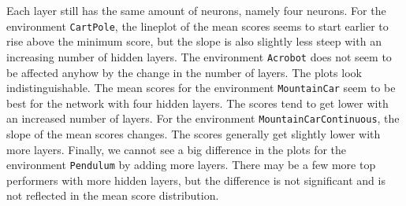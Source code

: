 Each layer still has the same amount of neurons, namely four neurons. For the environment \verb|CartPole|, the lineplot of the mean scores seems to start earlier to rise above the minimum score, but the slope is also slightly less steep with an increasing number of hidden layers. The environment \verb|Acrobot| does not seem to be affected anyhow by the change in the number of layers. The plots look indistinguishable. The mean scores for the environment \verb|MountainCar| seem to be best for the network with four hidden layers. The scores tend to get lower with an increased number of layers. For the environment \verb|MountainCarContinuous|, the slope of the mean scores changes. The scores generally get slightly lower with more layers. Finally, we cannot see a big difference in the plots for the environment \verb|Pendulum| by adding more layers. There may be a few more top performers with more hidden layers, but the difference is not significant and is not reflected in the mean score distribution.

